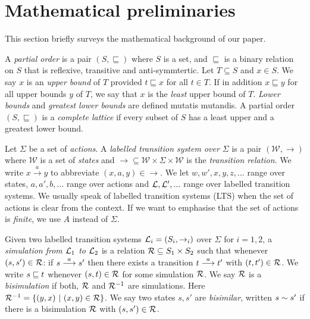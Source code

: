 \section{Mathematical preliminaries}\label{preliminaries}

\NI This section briefly surveys the mathematical background of our
paper.

\begin{definition}
A \emph{partial order} is a pair $(S, \sqsubseteq)$ where $S$ is a
set, and $\sqsubseteq$ is a binary relation on $S$ that is reflexive,
transitive and anti-symmtertic.  Let $T \subseteq S$ and $x \in S$. We
say $x$ is an \emph{upper bound} of $T$ provided $t \sqsubseteq x$ for
all $t \in T$. If in addition $x \sqsubseteq y$ for all upper bounds
$y$ of $T$, we say that $x$ is the \emph{least} upper bound of
$T$. \emph{Lower bounds} and \emph{greatest lower bounds} are defined
mutatis mutandis.  A partial order $(S, \sqsubseteq)$ is a
\emph{complete lattice} if every subset of $S$ has a least upper and a
greatest lower bound.
\end{definition}

\begin{definition}
Let $\Sigma$ be a set of \emph{actions}.  A \emph{labelled transition
  system over $\Sigma$} is a pair $(\mathcal{W}, \rightarrow)$ where $\mathcal{W}$ is a
set of \emph{states} and $\rightarrow \subseteq \mathcal{W} \times \Sigma \times
\mathcal{W}$ is the \emph{transition relation}.  We write $x \xrightarrow{a} y$
to abbreviate $(x,a,y) \in \rightarrow$. We let $w, w', x, y,
z, ...$ range over states, $a, a', b, ...$ range over actions and
$\mathcal{L}, \mathcal{L}', ...$ range over labelled transition systems. We usually
speak of labelled transition systems (LTS) when the set of actions is
clear from the context. If we want to emphasise that the set of
actions is \emph{finite}, we use $A$ instead of $\Sigma$.
\end{definition}

\begin{definition}
Given two labelled transition systems $\mathcal{L}_i = (S_i, \rightarrow_i)$
over $\Sigma$ for $i = 1, 2$, a \emph{simulation from $\mathcal{L}_1$ to
  $\mathcal{L}_2$} is a relation $\mathcal{R} \subseteq S_1 \times S_2$ such that
whenever $(s, s') \in \mathcal{R}$: if $s \stackrel{a}{\longrightarrow} s'$ then there exists a
transition $t \stackrel{a}{\longrightarrow} t'$ with $(t, t') \in \mathcal{R}$.  We write $s \sqsubseteq
t$ whenever $(s, t) \in \mathcal{R}$ for some simulation $\mathcal{R}$.  We say
$\mathcal{R}$ is a \emph{bisimulation} if both, $\mathcal{R}$ and $\mathcal{R}^{-1}$ are
simulations. Here $\mathcal{R}^{-1} = \{(y, x)\ |\ (x, y) \in \mathcal{R}\}$.  We
say two states $s, s'$ are \emph{bisimilar}, written $s \sim s'$ if
there is a bisimulation $\mathcal{R}$ with $(s, s') \in \mathcal{R}$.
\end{definition}

